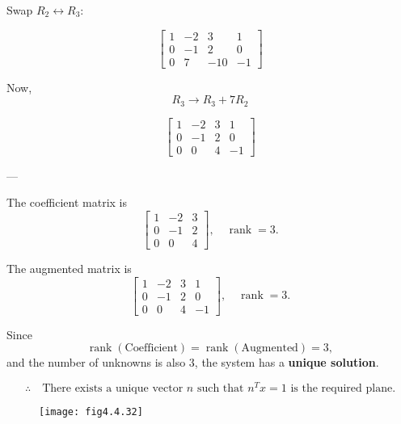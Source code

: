 \documentclass[journal]{IEEEtran}
\begin{document}
Swap \(R_2 \leftrightarrow R_3\):

\[
\left[
\begin{array}{ccc|c}
1 & -2 & 3 & 1 \\
0 & -1 & 2 & 0 \\
0 & 7 & -10 & -1
\end{array}
\right]
\]

Now,
\[
R_3 \to R_3 + 7R_2
\]

\[
\left[
\begin{array}{ccc|c}
1 & -2 & 3 & 1 \\
0 & -1 & 2 & 0 \\
0 & 0 & 4 & -1
\end{array}
\right]
\]

---

The coefficient matrix is
\[
\begin{bmatrix}
1 & -2 & 3 \\
0 & -1 & 2 \\
0 & 0 & 4
\end{bmatrix}, 
\quad \operatorname{rank} = 3.
\]

The augmented matrix is
\[
\begin{bmatrix}
1 & -2 & 3 & 1 \\
0 & -1 & 2 & 0 \\
0 & 0 & 4 & -1
\end{bmatrix}, 
\quad \operatorname{rank} = 3.
\]

Since
\[
\operatorname{rank}(\text{Coefficient}) 
= \operatorname{rank}(\text{Augmented}) = 3,
\]
and the number of unknowns is also \(3\), the system has a \textbf{unique solution}.  

\[
\therefore \quad \text{There exists a unique vector } n 
\text{ such that } n^T x = 1 \text{ is the required plane.}
\]
\begin{figure}[h!]
    \centering
    \texttt{[image: fig4.4.32]}
    \label{figure_1}
\end{figure}
 
\end{document}
